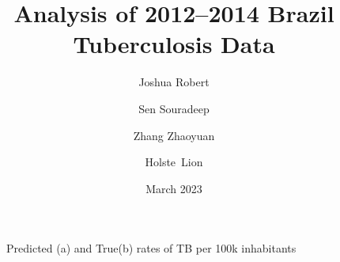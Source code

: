 \documentclass{article}
\title{Analysis of 2012--2014 Brazil Tuberculosis Data}
\author{
    Joshua Robert \\
    \and
    Sen Souradeep \\
    \and
    Zhang Zhaoyuan \\
    \and
    Holste Lion
}
\date{March 2023}
\begin{document}
\maketitle











\begin{figure}[H]
	\centering
	\qquad
	\caption{Predicted (a) and True(b) rates of TB per 100k inhabitants}%
	\label{fig:pred_TB_rate_map}%
\end{figure}




\end{document}
